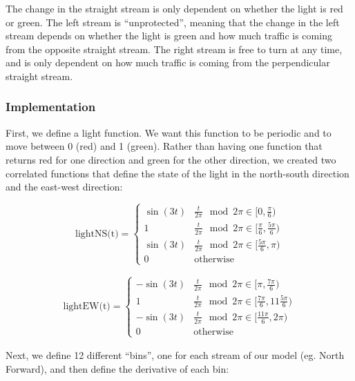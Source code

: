 \documentclass[12pt]{article}
\begin{document}
	The change in the straight stream is only dependent on whether the light is red or green. The left stream is “unprotected”, meaning that the change in the left stream depends on whether the light is green and how much traffic is coming from the opposite straight stream. The right stream is free to turn at any time, and is only dependent on how much traffic is coming from the perpendicular straight stream.
	
	\subsubsection{Implementation}
	
	First, we define a light function. We want this function to be periodic and to move between 0 (red) and 1 (green). Rather than having one function that returns red for one direction and green for the other direction, we created two correlated functions that define the state of the light in the north-south direction and the east-west direction:
	
	\[
	\textrm{lightNS(t)} =
	\begin{cases} 
	\sin(3t) & \frac{t}{ 2\pi} \mod 2 \pi\in [0, \frac{\pi}{6}) \\
	1 & \frac{t}{ 2\pi} \mod 2 \pi\in [\frac{\pi}{6},\frac{5\pi}{6}) \\
	\sin(3t) & \frac{t}{ 2\pi} \mod 2 \pi\in [\frac{5\pi}{6}, \pi) \\
	0 & \text{otherwise}
	\end{cases}
	\]
	
	
	
	
	\begin{align*}
	\textrm{lightEW(t)} =
	\begin{cases} 
	-\sin(3t) & \frac{t}{2\pi} \mod 2 \pi \in [\pi,\frac{7\pi}{6} ) \\ 
	1 & \frac{t}{ 2\pi }\mod 2 \pi \in [\frac{7\pi}{6},11\frac{5\pi}{6} ) \\
	-\sin(3t) & \frac{t}{ 2\pi} \mod 2 \pi\in  [\frac{11\pi}{6}, 2 \pi) \\
	0 & \text{otherwise}
	\end{cases}
	\end{align*}
	
	Next, we define 12 different “bins”, one for each stream of our model (eg. North Forward), and then define the derivative of each bin:\\\\
	
\end{document}
